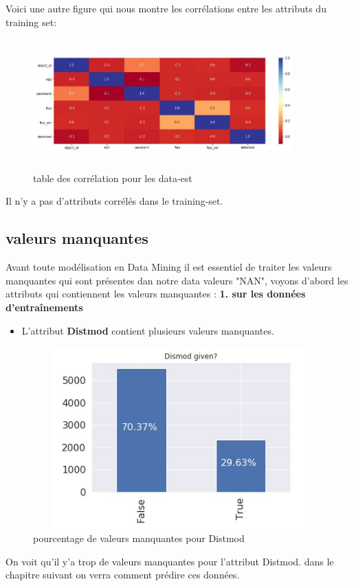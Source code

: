 \newline Voici une autre figure qui nous montre les corrélations entre les attributs du training set:
\begin{figure}[!h]
    \centering
    \includegraphics[width=10cm,height=5cm]{report/figures/correlation1.jpg}
    \caption{table des corrélation pour les data-est}
    \label{fig:my_label}
\end{figure}
Il n'y a pas d'attributs corrélés dans le training-set.



\newpage
\subsection{valeurs manquantes}
Avant toute modélisation en Data Mining il est essentiel de traiter les valeurs manquantes qui sont présentes dan notre data valeurs "NAN", voyons d'abord les attributs qui contiennent les valeurs manquantes :
\newline
\textbf{1. sur les données d'entraînements}
\newline
\begin{itemize}
    \item L'attribut \textbf{Distmod} contient plusieurs valeurs manquantes. 
\end{itemize}

\begin{figure}[!h]
    \centering
    \includegraphics[width=12cm,height=7cm]{report/figures/distmod.jpg}
    \caption{pourcentage de valeurs manquantes pour Distmod}
    \label{fig:my_label}
\end{figure}
On voit qu'il y'a trop de valeurs manquantes pour l'attribut Distmod. dans le chapitre suivant on verra comment prédire ces données. 
\newline

